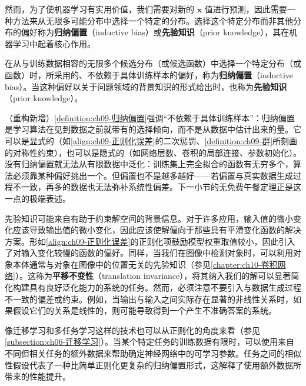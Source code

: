 \documentclass[../../main.tex]{subfiles}
\begin{document}
然而，为了使机器学习有实用价值，我们需要对新的 $\boldsymbol{x}$ 值进行预测，因此需要一种方法来从无限多可能分布中选择一个特定的分布。选择这个特定分布而非其他分布的偏好称为\textbf{归纳偏置}（inductive bias）或\textbf{先验知识}（prior knowledge），其在机器学习中起着核心作用。

\begin{definition}[归纳偏置]\label{definition:ch09-归纳偏置}
在从与训练数据相容的无限多个候选分布（或候选函数）中选择一个特定分布（或函数）时，所采用的、不依赖于具体训练样本的偏好，称为\textbf{归纳偏置}（inductive bias）。当这种偏好以关于问题领域的背景知识的形式给出时，也称为\textbf{先验知识}（prior knowledge）。
\end{definition}

\begin{remark}（重构新增）\cref{definition:ch09-归纳偏置}强调“不依赖于具体训练样本”：归纳偏置是学习算法在见到数据之前就带有的选择倾向，而不是从数据中估计出来的量。它可以是显式的（如\eqref{align:ch09-正则化误差}的二次惩罚、\cref{definition:ch09-群}所刻画的对称性约束），也可以是隐式的（如网络层数、卷积的局部连接、参数初始化）。没有归纳偏置就无法从有限数据中泛化：训练集上完全拟合的函数有无穷多个，算法必须靠某种偏好挑出一个。但偏置也不是越多越好——若偏置与真实数据生成过程不一致，再多的数据也无法弥补系统性偏差。下一小节的无免费午餐定理正是这一点的极端表述。
\end{remark}

先验知识可能来自有助于约束解空间的背景信息。对于许多应用，输入值的微小变化应该导致输出值的微小变化，因此应该使解偏向于那些具有平滑变化函数的解决方案。形如\eqref{align:ch09-正则化误差}的正则化项鼓励模型权重取值较小，因此引入了对输入变化较慢的函数的偏好。同样，当我们在图像中检测对象时，可以利用对象本体通常与对象在图像中的位置无关的先验知识（参见\cref{chapter:ch10-卷积网络}）。这称为\textbf{平移不变性}（translation invariance），将其纳入我们的解可以显著简化构建具有良好泛化能力的系统的任务。然而，必须注意不要引入与数据生成过程不一致的偏差或约束。例如，当输出与输入之间实际存在显著的非线性关系时，如果假设它们的关系是线性的，则可能导致得到一个产生不准确答案的系统。

像迁移学习和多任务学习这样的技术也可以从正则化的角度来看（参见\cref{subsection:ch06-迁移学习}）。当某个特定任务的训练数据有限时，可以使用来自不同但相关任务的额外数据来帮助确定神经网络中的可学习参数。任务之间的相似性假设代表了一种比简单正则化更复杂的归纳偏置形式，这解释了使用额外数据所带来的性能提升。
\end{document}
